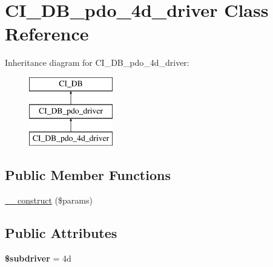 \hypertarget{class_c_i___d_b__pdo__4d__driver}{}\section{C\+I\+\_\+\+D\+B\+\_\+pdo\+\_\+4d\+\_\+driver Class Reference}
\label{class_c_i___d_b__pdo__4d__driver}
Inheritance diagram for C\+I\+\_\+\+D\+B\+\_\+pdo\+\_\+4d\+\_\+driver\+:\begin{figure}[H]
\begin{center}
\leavevmode
\includegraphics[height=3.000000cm]{class_c_i___d_b__pdo__4d__driver}
\end{center}
\end{figure}
\subsection*{Public Member Functions}
\begin{DoxyCompactItemize}
\item 
\mbox{\hyperlink{class_c_i___d_b__pdo__4d__driver_adaf0303dddbe1d77a2227b36d94307ea}{\+\_\+\+\_\+construct}} (\$params)
\end{DoxyCompactItemize}
\subsection*{Public Attributes}
\begin{DoxyCompactItemize}
\item 
\mbox{\label{class_c_i___d_b__pdo__4d__driver_aa4ebc48986e02198c18774224fc61d54}} 
{\bfseries \$subdriver} = \textquotesingle{}4d\textquotesingle{}
\end{DoxyCompactItemize}
